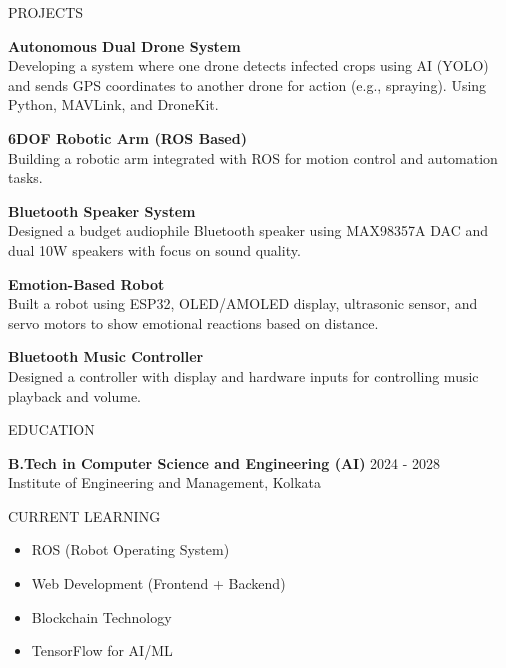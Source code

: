 \documentclass{resume}
\begin{document}
\begin{rSection}{PROJECTS}

\textbf{Autonomous Dual Drone System} \\
Developing a system where one drone detects infected crops using AI (YOLO) and sends GPS coordinates to another drone for action (e.g., spraying). Using Python, MAVLink, and DroneKit.

\textbf{6DOF Robotic Arm (ROS Based)} \\
Building a robotic arm integrated with ROS for motion control and automation tasks.

\textbf{Bluetooth Speaker System} \\
Designed a budget audiophile Bluetooth speaker using MAX98357A DAC and dual 10W speakers with focus on sound quality.

\textbf{Emotion-Based Robot} \\
Built a robot using ESP32, OLED/AMOLED display, ultrasonic sensor, and servo motors to show emotional reactions based on distance.

\textbf{Bluetooth Music Controller} \\
Designed a controller with display and hardware inputs for controlling music playback and volume.

\end{rSection}


\begin{rSection}{EDUCATION}

{\bf B.Tech in Computer Science and Engineering (AI)} \hfill {2024 - 2028} \\
Institute of Engineering and Management, Kolkata

\end{rSection}


\begin{rSection}{CURRENT LEARNING}

\begin{itemize}
    \item ROS (Robot Operating System)
    \item Web Development (Frontend + Backend)
    \item Blockchain Technology
    \item TensorFlow for AI/ML
\end{itemize}

\end{rSection}
\end{document}
